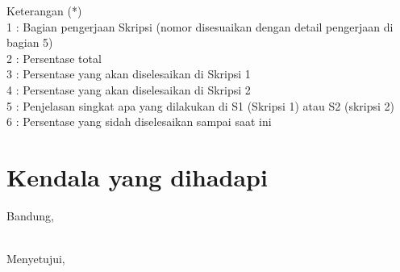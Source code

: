 \documentclass[a4paper,twoside]{article}
\begin{document}
Keterangan (*)\\
1 : Bagian pengerjaan Skripsi (nomor disesuaikan dengan detail pengerjaan di bagian 5)\\
2 : Persentase total \\
3 : Persentase yang akan diselesaikan di Skripsi 1 \\
4 : Persentase yang akan diselesaikan di Skripsi 2 \\
5 : Penjelasan singkat apa yang dilakukan di S1 (Skripsi 1) atau S2 (skripsi 2)\\
6 : Persentase yang sidah diselesaikan sampai saat ini 

\section{Kendala yang dihadapi}

\vspace{1cm}
\centering Bandung, \tanggal\\
\vspace{2cm} \nama \\ 
\vspace{1cm}

Menyetujui, \\
\end{document}
